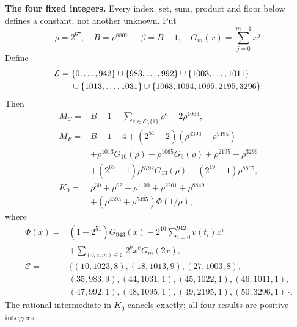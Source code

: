 \textbf{The four fixed integers.}
Every index, set, sum, product and floor below defines a constant, not
another unknown. Put
\[
\rho=2^{67},\quad B=\rho^{8807},\quad\beta=B-1,\quad
G_m(x)=\sum_{j=0}^{m-1}x^j.
\]
Define
\[
\begin{split}
\mathcal E={}&\{0,\ldots,942\}\cup\{983,\ldots,992\}\cup\{1003,\ldots,1011\}\\
&\cup\{1013,\ldots,1031\}\cup\{1063,1064,1095,2195,3296\}.
\end{split}
\]
Then
\begin{align*}
M_C={}&B-1-\sum_{e\in\mathcal E\setminus\{1\}}\rho^e-2\rho^{1063},\\
M_F={}&B-1+4+(2^{51}-2)(\rho^{4393}+\rho^{5495})\\
&+\rho^{1013}G_{10}(\rho)+\rho^{1065}G_9(\rho)
  +\rho^{2195}+\rho^{3296}\\
&+(2^{65}-1)\rho^{8792}G_{13}(\rho)+(2^{19}-1)\rho^{8805},\\
K_0={}&\rho^{30}+\rho^{62}+\rho^{1100}+\rho^{2201}+\rho^{8849}\\
&+(\rho^{4393}+\rho^{5495})\Phi(1/\rho),
\end{align*}
where
\[
\begin{split}
\Phi(x)={}&(1+2^{51})G_{943}(x)
 -2^{10}\sum_{i=0}^{942}v(t_i)x^i\\
&+\sum_{(b,e,m)\in\mathcal C}2^b x^e G_m(2x),\\
\mathcal C={}&\{(10,1023,8),(18,1013,9),(27,1003,8),\\
&(35,983,9),(44,1031,1),(45,1022,1),(46,1011,1),\\
&(47,992,1),(48,1095,1),(49,2195,1),(50,3296,1)\}.
\end{split}
\]
The rational intermediate in $K_0$ cancels exactly; all four results are positive integers.

